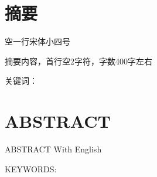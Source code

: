 \documentclass[UTF8，a4paper]{ctexrep}
\begin{document}
\songti
\chapter*{摘\qquad 要}{\heiti{}}
空一行宋体小四号

\noindent
\qquad 摘要内容，首行空2字符，字数400字左右


\noindent
关键词：
\clearpage

\chapter*{\textbf{ABSTRACT}}{\bf}

\qquad  ABSTRACT With English

KEYWORDS:
\newpage
\renewcommand{\cftdot}{$\cdot$}
\renewcommand{\cftdotsep}{1.5}
\setlength{\cftbeforechapskip}{10pt}

\renewcommand{\cftchapleader}{\cftdotfill{\cftchapdotsep}}
\renewcommand{\cftchapdotsep}{\cftdotsep}
\makeatletter
\renewcommand{\numberline}[1]{%
\settowidth\@tempdimb{#1\hspace{0.5em}}%
\ifdim\@tempdima<\@tempdimb%
  \@tempdima=\@tempdimb%
\fi%
\hb@xt@\@tempdima{\@cftbsnum #1\@cftasnum\hfil}\@cftasnumb}
\makeatother
\renewcommand\contentsname{目\qquad 录}
\tableofcontents
\renewcommand*{\listfigurename}{图目录}
\listoffigures
{}
\renewcommand*{\listtablename}{表目录}
\listoftables
{}
\end{document}

